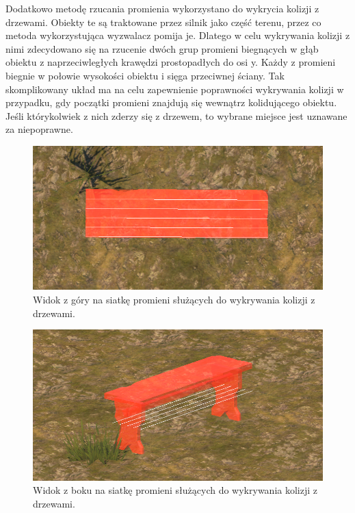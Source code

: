 Dodatkowo metodę rzucania promienia wykorzystano do wykrycia kolizji z drzewami. Obiekty te są traktowane przez silnik
jako część terenu, przez co metoda wykorzystująca wyzwalacz pomija je. Dlatego w celu wykrywania kolizji z nimi
zdecydowano się na rzucenie dwóch grup promieni biegnących w głąb obiektu z naprzeciwległych krawędzi prostopadłych do
osi y. Każdy z promieni biegnie w połowie wysokości obiektu i sięga przeciwnej ściany. Tak skomplikowany układ ma na
celu zapewnienie poprawności wykrywania kolizji w przypadku, gdy początki promieni znajdują się wewnątrz kolidującego
obiektu. Jeśli którykolwiek z nich zderzy się z drzewem, to wybrane miejsce jest uznawane za niepoprawne.

\begin{figure}[h!]
   \centering
   \includegraphics[width=.8\textwidth]{images/implementacja/mechanizm_budowania/gizmos_drzewo_2.png}
   \caption{Widok z góry na siatkę promieni służących do wykrywania kolizji z drzewami.}
\end{figure}
\begin{figure}[h!]
   \centering
   \includegraphics[width=.8\textwidth]{images/implementacja/mechanizm_budowania/gizmos_drzewo_1.png}
   \caption{Widok z boku na siatkę promieni służących do wykrywania kolizji z drzewami.}
\end{figure}
\FloatBarrier
